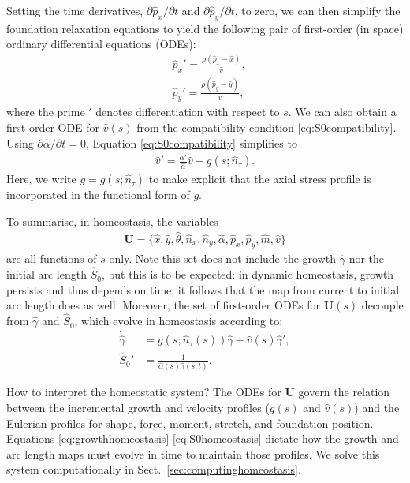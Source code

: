 Setting the time derivatives, $\partial\hat{p}_x/\partial t$ and $\partial\hat{p}_y/\partial t$, to zero, we can then simplify the foundation relaxation equations to yield the following pair of first-order (in space) ordinary differential equations (ODEs):
\begin{align}
&\hat{p}_x' = \frac{\rho(\hat{p}_x - \hat{x})}{\hat{v}},\label{eq:homeostasiseqnspx}\\
&\hat{p}_y' = \frac{\rho(\hat{p}_y - \hat{y})}{\hat{v}},\label{eq:homeostasiseqnspy}
\end{align}
where the prime $'$ denotes differentiation with respect to $s$. We can also obtain a first-order ODE for $\hat v(s)$ from the compatibility condition \eqref{eq:S0compatibility}. Using $\partial\hat{\alpha}/\partial t = 0$, Equation \eqref{eq:S0compatibility} simplifies to
\begin{align}
\hat{v}' = \frac{\hat{\alpha}'}{\hat\alpha}\hat{v} - g(s;\hat n_\tau)\label{eq:velocityinhomeostasis}.
\end{align}
Here, we write $g=g(s;\hat n_\tau)$ to make explicit that the axial stress profile is incorporated in the functional form of $g$.

To summarise, in homeostasis, the variables
\begin{align}
\mathbf{U}=\{\hat x,\hat y,\hat\theta,\hat n_x,\hat n_y, \hat\alpha, \hat p_x,\hat p_y,\hat m,\hat v\}\label{eq:timeindependentsolns}
\end{align}
are all functions of $s$ only. Note this set does not include the growth $\hat\gamma$ nor the initial arc length $\hat S_0$, but this is to be expected: in dynamic homeostasis, growth persists and thus depends on time; it follows that the map from current to initial arc length does as well. Moreover, the set of first-order ODEs for $\mathbf{U}(s)$ decouple from $\hat\gamma$ and $\hat S_0$, which evolve in homeostasis according to:
\begin{align}
\dot{\hat{\gamma}} &= g(s; \hat{n}_\tau(s))\hat{\gamma} + \hat{v}(s)\hat{\gamma}',\label{eq:growthhomeostasis}\\
{\hat S_0}'&=\frac{1}{\hat\alpha(s)\hat\gamma(s,t)}\label{eq:S0homeostasis}.
\end{align}

How to interpret the homeostatic system? The ODEs for $\mathbf{U}$ govern the relation between the incremental growth and velocity profiles ($g(s)$ and $\hat v(s)$) and the Eulerian profiles for shape, force, moment, stretch, and foundation position. Equations \eqref{eq:growthhomeostasis}-\eqref{eq:S0homeostasis} dictate how the growth and arc length maps must evolve in time to maintain those profiles. %
We solve this system computationally in Sect.\ \ref{sec:computinghomeostasis}. 

